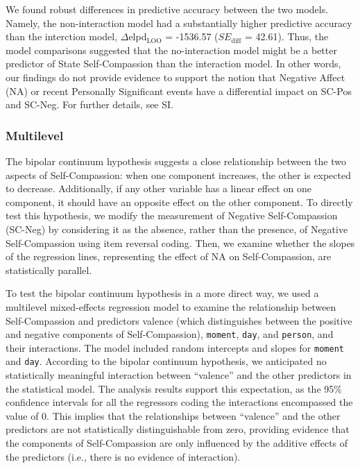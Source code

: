 \documentclass[
  man,floatsintext]{apa6}
\begin{document}
We found robust differences in predictive accuracy between the two models. Namely, the non-interaction model had a substantially higher predictive accuracy than the interction model, \(\Delta\)elpd\(_{\text{LOO}}\) = -1536.57 (\(SE_{\text{diff}}\) = 42.61). Thus, the model comparisons suggested that the no-interaction model might be a better predictor of State Self-Compassion than the interaction model. In other words, our findings do not provide evidence to support the notion that Negative Affect (NA) or recent Personally Significant events have a differential impact on SC-Pos and SC-Neg. For further details, see SI.

\hypertarget{multilevel}{%
\subsubsection{Multilevel}\label{multilevel}}

The bipolar continuum hypothesis suggests a close relationship between the two aspects of Self-Compassion: when one component increases, the other is expected to decrease. Additionally, if any other variable has a linear effect on one component, it should have an opposite effect on the other component. To directly test this hypothesis, we modify the measurement of Negative Self-Compassion (SC-Neg) by considering it as the absence, rather than the presence, of Negative Self-Compassion using item reversal coding. Then, we examine whether the slopes of the regression lines, representing the effect of NA on Self-Compassion, are statistically parallel.

To test the bipolar continuum hypothesis in a more direct way, we used a multilevel mixed-effects regression model to examine the relationship between Self-Compassion and predictors valence (which distinguishes between the positive and negative components of Self-Compassion), \texttt{moment}, \texttt{day}, and \texttt{person}, and their interactions. The model included random intercepts and slopes for \texttt{moment} and \texttt{day}. According to the bipolar continuum hypothesis, we anticipated no statistically meaningful interaction between ``valence'' and the other predictors in the statistical model. The analysis results support this expectation, as the 95\% confidence intervals for all the regressors coding the interactions encompassed the value of 0. This implies that the relationships between ``valence'' and the other predictors are not statistically distinguishable from zero, providing evidence that the components of Self-Compassion are only influenced by the additive effects of the predictors (i.e., there is no evidence of interaction).
\end{document}
